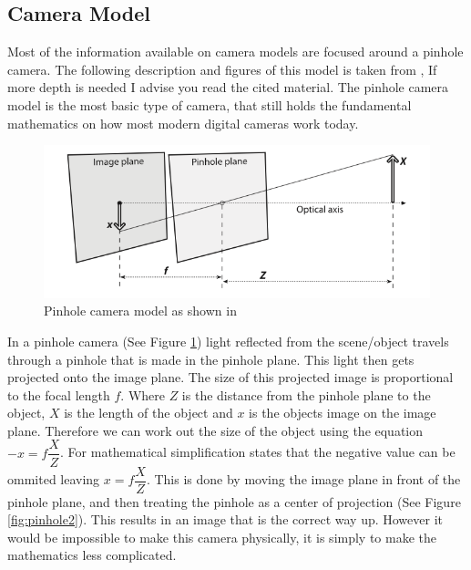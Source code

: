 \documentclass[11pt,oneside]{report}
\begin{document}
				\subsection{Camera Model}
				Most of the information available on camera models are focused around a pinhole camera.
				The following description and figures of this model is taken from , If more depth is needed I advise you read the cited material.
				The pinhole camera model is the most basic type of camera, that still holds the fundamental mathematics on how most modern digital cameras work today.
				\begin{figure}[!ht]
				\begin{center}
					\includegraphics[scale=0.5]{pinhole}
					\caption{Pinhole camera model as shown in \protect{} {\label{fig:pinhole}}}
				\end{center}
				\end{figure}
				In a pinhole camera (See Figure \ref{fig:pinhole}) light reflected from the scene/object travels through a pinhole that is made in the pinhole plane.
				This light then gets projected onto the image plane.
				The size of this projected image is proportional to the focal length $f$.
				Where $Z$ is the distance from the pinhole plane to the object, $X$ is the length of the object and $x$ is the objects image on the image plane.
				Therefore we can work out the size of the object using the equation $-x=f\dfrac{X}{Z}$.
				For mathematical simplification  states that the negative value can be ommited leaving $x=f\dfrac{X}{Z}$.
				This is done by moving the image plane in front of the pinhole plane, and then treating the pinhole as a center of projection (See Figure \ref{fig:pinhole2}).
				This results in an image that is the correct way up. However it would be impossible to make this camera physically, it is simply to make the mathematics less complicated.
\end{document}
